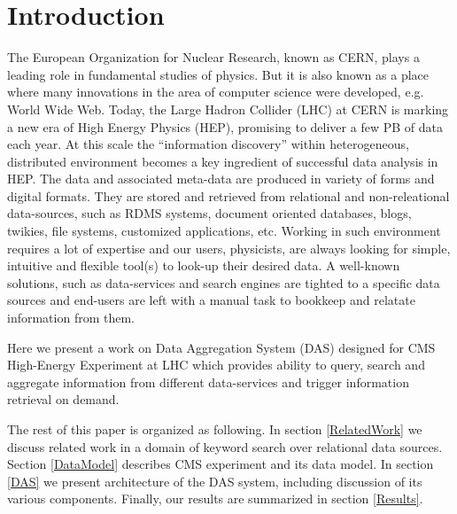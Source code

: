 \documentclass[a4paper]{jpconf}
\begin{document}
\section{Introduction}
The European Organization for Nuclear Research, known as CERN, plays a leading
role in fundamental studies of physics. But it is also known as a place where
many innovations in the area of computer science were developed, e.g. World Wide Web.
Today, the Large Hadron Collider (LHC) at CERN is marking a new era of High Energy
Physics (HEP), promising to deliver a few PB of data each year. 
At this scale the ``information discovery'' within heterogeneous, distributed 
environment becomes a key ingredient of successful data analysis in HEP.
The data and associated meta-data are produced in variety of forms and digital formats.
They are stored and retrieved from relational and non-releational data-sources, such as 
RDMS systems, document oriented databases, blogs, twikies, file systems,
customized applications, etc. 
Working in such environment requires a lot of expertise and our users, physicists, 
are always looking for simple, intuitive and flexible
tool(s) to look-up their desired data. A well-known solutions, such as data-services
and search engines are tighted to a specific data sources and end-users are left 
with a manual task to bookkeep and relatate information from them.

Here we present a work on Data Aggregation System (DAS) designed for
CMS High-Energy Experiment at LHC which provides
ability to query, search and aggregate information from different 
data-services and trigger information retrieval on demand.

The rest of this paper is organized as following. 
In section \ref{RelatedWork} we discuss related work in a domain of 
keyword search over relational data sources.
Section \ref{DataModel} describes CMS experiment and its data model. In section
\ref{DAS} we present architecture of the DAS system, including discussion of its
various components. Finally, our results are summarized in section \ref{Results}.

\end{document}
